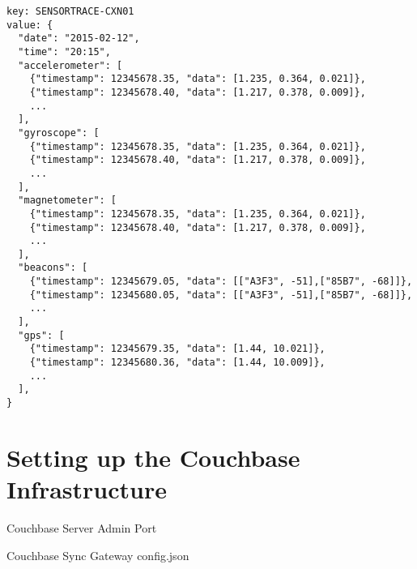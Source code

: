 \begin{lstlisting}[basicstyle=\footnotesize]
key: SENSORTRACE-CXN01
value: {
  "date": "2015-02-12",
  "time": "20:15",
  "accelerometer": [
    {"timestamp": 12345678.35, "data": [1.235, 0.364, 0.021]},
    {"timestamp": 12345678.40, "data": [1.217, 0.378, 0.009]},
    ...
  ],
  "gyroscope": [
    {"timestamp": 12345678.35, "data": [1.235, 0.364, 0.021]},
    {"timestamp": 12345678.40, "data": [1.217, 0.378, 0.009]},
    ...
  ],
  "magnetometer": [
    {"timestamp": 12345678.35, "data": [1.235, 0.364, 0.021]},
    {"timestamp": 12345678.40, "data": [1.217, 0.378, 0.009]},
    ...
  ],
  "beacons": [
    {"timestamp": 12345679.05, "data": [["A3F3", -51],["85B7", -68]]},
    {"timestamp": 12345680.05, "data": [["A3F3", -51],["85B7", -68]]},
    ...
  ],
  "gps": [
    {"timestamp": 12345679.35, "data": [1.44, 10.021]},
    {"timestamp": 12345680.36, "data": [1.44, 10.009]},
    ...
  ],
}
\end{lstlisting}


\section{Setting up the Couchbase Infrastructure}

Couchbase Server
Admin Port

Couchbase Sync Gateway
config.json